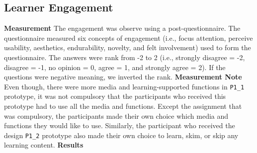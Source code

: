 \subsection{Learner Engagement} 
\noindent\textbf{Measurement} 
\newline
The engagement was observe using a post-questionnaire. The questionnaire measured six concepts of engagement (i.e., focus attention, perceive usability, aesthetics, endurability, novelty, and felt involvement) used to form the questionnaire. The answers were rank from -2 to 2 (i.e., strongly disagree = -2, disagree = -1, no opinion = 0, agree = 1, and strongly agree = 2). If the questions were negative meaning, we inverted the rank. 
\newline 
\newline 
\noindent\textbf{Measurement Note} 
\newline
Even though, there were more media and learning-supported functions in \verb|P1_1| prototype, it was not compulsory that the participants who received this prototype had to use all the media and functions. Except the assignment that was compulsory, the participants made their own choice which media and functions they would like to use. Similarly, the participant who received the design \verb|P1_2| prototype also made their own choice to learn, skim, or skip any learning content. 
\newline 
\newline 
\noindent\textbf{Results} 
